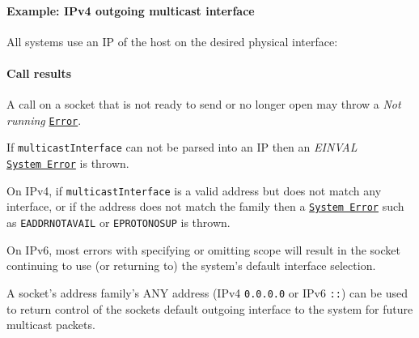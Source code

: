 \paragraph{Example: IPv4 outgoing multicast
interface}\label{example-ipv4-outgoing-multicast-interface}

All systems use an IP of the host on the desired physical interface:

\begin{Shaded}
\begin{Highlighting}[]
\OperatorTok{=}\NormalTok{(}\NormalTok{)}\OperatorTok{;}

\NormalTok{(}\OperatorTok{,}\NormalTok{ () }\KeywordTok{=\textgreater{}}\NormalTok{ \{}
\NormalTok{(}\NormalTok{)}\OperatorTok{;}
\NormalTok{\})}\OperatorTok{;}
\end{Highlighting}
\end{Shaded}

\paragraph{Call results}\label{call-results}

A call on a socket that is not ready to send or no longer open may throw
a \emph{Not running} \href{errors.md\#class-error}{\texttt{Error}}.

If \texttt{multicastInterface} can not be parsed into an IP then an
\emph{EINVAL}
\href{errors.md\#class-systemerror}{\texttt{System\ Error}} is thrown.

On IPv4, if \texttt{multicastInterface} is a valid address but does not
match any interface, or if the address does not match the family then a
\href{errors.md\#class-systemerror}{\texttt{System\ Error}} such as
\texttt{EADDRNOTAVAIL} or \texttt{EPROTONOSUP} is thrown.

On IPv6, most errors with specifying or omitting scope will result in
the socket continuing to use (or returning to) the system's default
interface selection.

A socket's address family's ANY address (IPv4
\texttt{\textquotesingle{}0.0.0.0\textquotesingle{}} or IPv6
\texttt{\textquotesingle{}::\textquotesingle{}}) can be used to return
control of the sockets default outgoing interface to the system for
future multicast packets.

